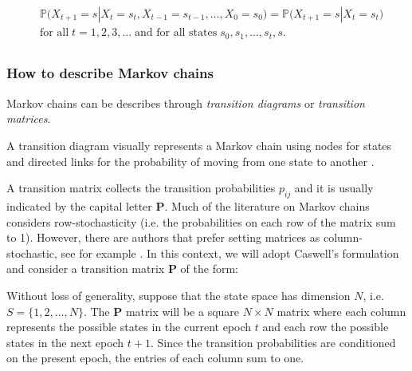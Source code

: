 \documentclass[\main/main.tex]{subfiles}
\begin{document}
\begin{equation}
\begin{split}
     & \mathds{P} \big(X_{t+1} = s |X_t = s_t, X_{t-1} = s_{t-1}, . . . , X_0 = s_0\big) = 
     \mathds{P} \big(X_{t+1} = s |X_t = s_t\big)\\
    & \text{for all} \; t = 1, 2, 3, ... \; \text{and for all states} \; s_0, s_1, . . . , s_t, s.\\
\end{split}
\end{equation}


\subsubsection{How to describe Markov chains}

Markov chains can be describes through \textit{transition diagrams} or \textit{transition matrices}.

A transition diagram visually represents a Markov chain using nodes for states and directed links for the probability of moving from one state to another \citep{Gagniuc2017}. 

A transition matrix collects the transition probabilities $p_{ij}$ and it is usually indicated by the capital letter $\mathbf{P}$. 
Much of the literature on Markov chains considers row-stochasticity (i.e. the probabilities on each row of the matrix sum to 1). However, there are authors that prefer setting matrices as column-stochastic, see for example \cite{Caswell2006}. In this context, we will adopt Caswell's formulation and consider a transition matrix $\mathbf{P}$ of the form:


\begin{center}
\end{center}

\noindent Without loss of generality, suppose that the state space has dimension $N$, i.e. $S = \{1, 2, . . . ,N\}$. The $\mathbf{P}$ matrix will be a square $N \times N $ matrix where each column represents the possible states in the current epoch $t$ and each row the possible states in the next epoch $t+1$. Since the transition probabilities are conditioned on the present epoch, the entries of each column sum to one.\\
\end{document}
